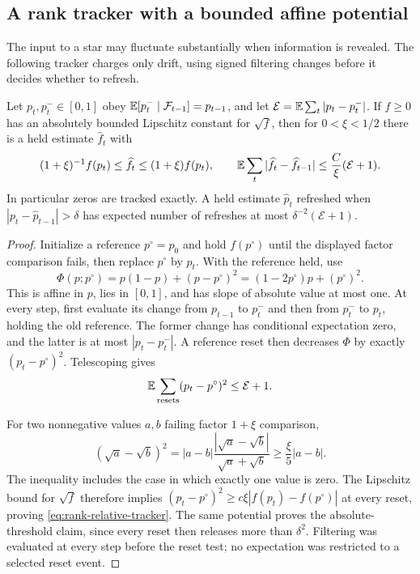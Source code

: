 \subsection{A rank tracker with a bounded affine potential}

The input to a star may fluctuate substantially when information is
revealed.  The following tracker charges only drift, using signed
filtering changes before it decides whether to refresh.

\begin{lemma}\label{lem:rank-tracking}
Let $p_t,p_t^-\in[0,1]$ obey
$\mathbb E[p_t^-\mid\mathcal F_{t-1}]=p_{t-1}$, and let
$\mathcal E=\mathbb E\sum_t|p_t-p_t^-|$.
If $f\ge0$ has an absolutely bounded Lipschitz constant for $\sqrt f$,
then for $0<\xi<1/2$ there is a held estimate $\widehat f_t$ with
\begin{equation}\label{eq:rank-relative-tracker}
 (1+\xi)^{-1}f(p_t)\le\widehat f_t\le(1+\xi)f(p_t),\qquad
 \mathbb E\sum_t|\widehat f_t-\widehat f_{t-1}|
       \le\frac{C}{\xi}(\mathcal E+1).
\end{equation}
In particular zeros are tracked exactly.  A held estimate
$\widehat p_t$ refreshed when $|p_t-\widehat p_{t-1}|>\delta$
has expected number of refreshes at most
$\delta^{-2}(\mathcal E+1)$.
\end{lemma}

\begin{proof}
Initialize a reference $p^\circ=p_0$ and hold $f(p^\circ)$ until
the displayed factor comparison fails, then replace $p^\circ$ by
$p_t$.  With the reference held, use
\[
 \Phi(p;p^\circ)=p(1-p)+(p-p^\circ)^2
              =(1-2p^\circ)p+(p^\circ)^2.
\]
This is affine in $p$, lies in $[0,1]$, and has slope of absolute
value at most one.  At every step, first evaluate its change from
$p_{t-1}$ to $p_t^-$ and then from $p_t^-$ to $p_t$, holding the old
reference.  The former change has conditional expectation zero, and
the latter is at most $|p_t-p_t^-|$.  A reference reset then decreases
$\Phi$ by exactly $(p_t-p^\circ)^2$.  Telescoping gives
\begin{equation}\label{eq:rank-reset-credit}
        \mathbb E\sum_{\text{resets}}(p_t-p^\circ)^2\le\mathcal E+1.
\end{equation}

For two nonnegative values $a,b$ failing factor $1+\xi$ comparison,
\[
 (\sqrt a-\sqrt b)^2
 =|a-b|\frac{|\sqrt a-\sqrt b|}{\sqrt a+\sqrt b}
 \ge \frac{\xi}{5}|a-b|.
\]
The inequality includes the case in which exactly one value is zero.
The Lipschitz bound for $\sqrt f$ therefore implies
$(p_t-p^\circ)^2\ge c\xi|f(p_t)-f(p^\circ)|$ at every reset,
proving \eqref{eq:rank-relative-tracker}.  The same potential proves
the absolute-threshold claim, since every reset then releases more
than $\delta^2$.  Filtering was evaluated at every step before the
reset test; no expectation was restricted to a selected reset event.
\end{proof}

